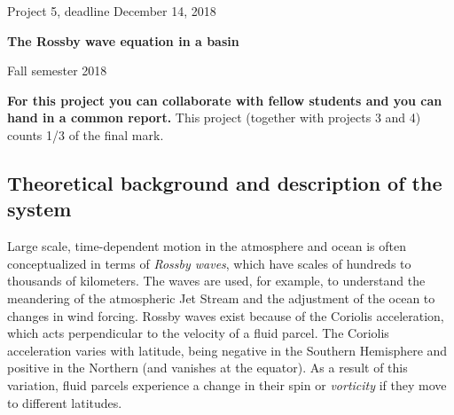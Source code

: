 \documentclass[%
oneside,                 %
final,                   %
10pt]{article}
\begin{document}

\newcommand{\exercisesection}[1]{\subsection*{#1}}






\thispagestyle{empty}

\begin{center}
{\LARGE\bf
\begin{spacing}{1.25}
Project 5, deadline  December 14, 2018
\end{spacing}
}
\end{center}


\begin{center}
{\bf The Rossby wave equation in a basin${}^{}$} \\ [0mm]
\end{center}

\begin{center}
\end{center}
    

\begin{center}
Fall semester 2018
\end{center}

\vspace{1cm}


\textbf{For this project you can collaborate with fellow students and you can  hand in a common report.}
This project (together with projects 3 and 4) counts 1/3 of the final mark.


\subsection{Theoretical background and description of the system}

Large scale, time-dependent motion in the atmosphere and ocean is
often conceptualized in terms of \emph{Rossby waves}, which have scales
of hundreds to thousands of kilometers. The waves are used, for
example, to understand the meandering of the atmospheric Jet Stream
and the adjustment of the ocean to changes in wind forcing. Rossby
waves exist because of the Coriolis acceleration, which acts
perpendicular to the velocity of a fluid parcel. The Coriolis
acceleration varies with latitude, being negative in the Southern
Hemisphere and positive in the Northern (and vanishes at the equator).
As a result of this variation, fluid parcels experience a change in
their spin or \emph{vorticity} if they move to different latitudes.
\end{document}
